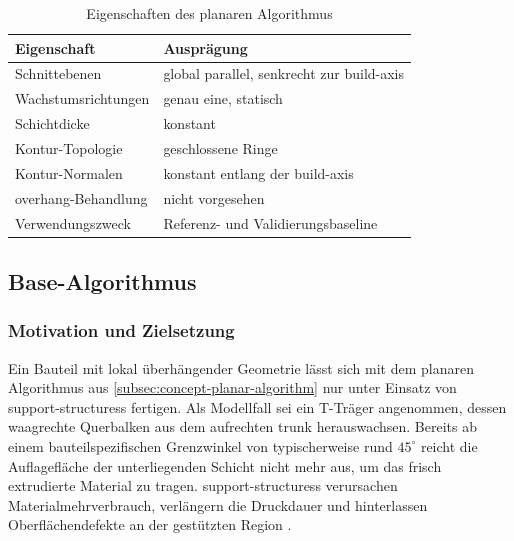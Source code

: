                \begin{table}[!ht]
                    \centering
                    \caption[Eigenschaften des planaren Algorithmus]{Eigenschaften des planaren Algorithmus}
                    \label{tab:concept-planar-properties}
                    \renewcommand{\arraystretch}{1.25}
                    \begin{tabular}{@{} l l @{}}
                        \toprule
                        \textbf{Eigenschaft} & \textbf{Ausprägung} \\
                        \midrule
                        Schnittebenen           & global parallel, senkrecht zur \gls{build-axis} \\
                        Wachstumsrichtungen     & genau eine, statisch \\
                        Schichtdicke            & konstant \\
                        Kontur-Topologie        & geschlossene Ringe \\
                        Kontur-Normalen         & konstant entlang der \gls{build-axis} \\
                        \Gls{overhang}-Behandlung & nicht vorgesehen \\
                        Verwendungszweck        & Referenz- und Validierungsbaseline \\
                        \bottomrule
                    \end{tabular}
                \end{table}

        \subsection{Base-Algorithmus}\label{subsec:concept-base-algorithm} 
            \subsubsection{Motivation und Zielsetzung}\label{subsubsec:concept-base-motivation}
                Ein Bauteil mit lokal überhängender Geometrie lässt sich mit dem planaren Algorithmus aus \cref{subsec:concept-planar-algorithm} nur unter Einsatz von \glspl{support-structures} fertigen.
                Als Modellfall sei ein T-Träger angenommen, dessen waagrechte Querbalken aus dem aufrechten \gls{trunk} herauswachsen.
                Bereits ab einem bauteilspezifischen Grenzwinkel von typischerweise rund $45^\circ$ \autocite[vgl.][S.~120]{vanekCleverSupportEfficient2014} reicht die Auflagefläche der unterliegenden Schicht nicht mehr aus, um das frisch extrudierte Material zu tragen.
                \Glspl{support-structures} verursachen Materialmehrverbrauch, verlängern die Druckdauer und hinterlassen Oberflächendefekte an der gestützten Region \autocites[vgl.][S.~1247]{stranoNewApproachDesign2013}[vgl.][S.~118]{vanekCleverSupportEfficient2014}.

